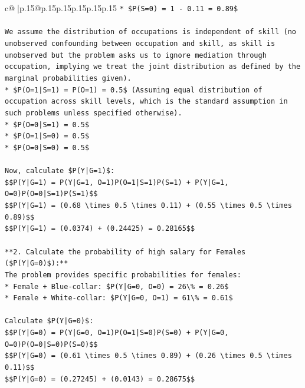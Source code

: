 \documentclass{article}
\begin{document}
{\begin{supertabular}{c@{$\;$}|p{.15\linewidth}@{}p{.15\linewidth}p{.15\linewidth}p{.15\linewidth}p{.15\linewidth}p{.15\linewidth}}
{{{\texttt{*   \$P(S=0) = 1 {-} 0.11 = 0.89\$} \\
\\ 
\texttt{We assume the distribution of occupations is independent of skill (no unobserved confounding between occupation and skill, as skill is unobserved but the problem asks us to ignore mediation through occupation, implying we treat the joint distribution as defined by the marginal probabilities given).} \\
\texttt{*   \$P(O=1|S=1) = P(O=1) = 0.5\$ (Assuming equal distribution of occupation across skill levels, which is the standard assumption in such problems unless specified otherwise).} \\
\texttt{*   \$P(O=0|S=1) = 0.5\$} \\
\texttt{*   \$P(O=1|S=0) = 0.5\$} \\
\texttt{*   \$P(O=0|S=0) = 0.5\$} \\
\\ 
\texttt{Now, calculate \$P(Y|G=1)\$:} \\
\texttt{\$\$P(Y|G=1) = P(Y|G=1, O=1)P(O=1|S=1)P(S=1) + P(Y|G=1, O=0)P(O=0|S=1)P(S=1)\$\$} \\
\texttt{\$\$P(Y|G=1) = (0.68 \textbackslash{}times 0.5 \textbackslash{}times 0.11) + (0.55 \textbackslash{}times 0.5 \textbackslash{}times 0.89)\$\$} \\
\texttt{\$\$P(Y|G=1) = (0.0374) + (0.24425) = 0.28165\$\$} \\
\\ 
\texttt{**2. Calculate the probability of high salary for Females (\$P(Y|G=0)\$):**} \\
\texttt{The problem provides specific probabilities for females:} \\
\texttt{*   Female + Blue{-}collar: \$P(Y|G=0, O=0) = 26\textbackslash{}\% = 0.26\$} \\
\texttt{*   Female + White{-}collar: \$P(Y|G=0, O=1) = 61\textbackslash{}\% = 0.61\$} \\
\\ 
\texttt{Calculate \$P(Y|G=0)\$:} \\
\texttt{\$\$P(Y|G=0) = P(Y|G=0, O=1)P(O=1|S=0)P(S=0) + P(Y|G=0, O=0)P(O=0|S=0)P(S=0)\$\$} \\
\texttt{\$\$P(Y|G=0) = (0.61 \textbackslash{}times 0.5 \textbackslash{}times 0.89) + (0.26 \textbackslash{}times 0.5 \textbackslash{}times 0.11)\$\$} \\
\texttt{\$\$P(Y|G=0) = (0.27245) + (0.0143) = 0.28675\$\$} \\
\\ 
}}}
\end{supertabular}}
\end{document}
